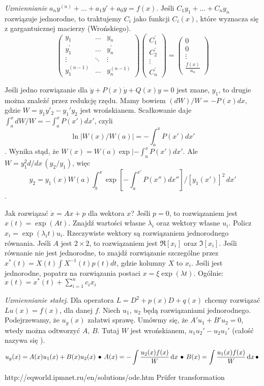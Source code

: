 \emph{Uzmiennianie}  $a_n y^{(n)} + \ldots + a_1 y' + a_0 y = f(x)$.
Jeśli $C_1 y_1 + \ldots + C_n y_n$ rozwiązuje jednorodne, to traktujemy $C_i$ jako funkcji $C_i(x)$, które wyznacza się z gargantuicznej macierzy (Wrońskiego).
\[
\begin{pmatrix} y_1 & \ldots & y_n \\ y_1^\prime & \ldots & y_n^\prime \\ \vdots & \ddots & \vdots \\ y_1^{(n-1)} & \ldots & y_n^{(n-1)} \end{pmatrix} \begin{pmatrix} C_1^\prime \\ C_2^\prime \\ \vdots \\ C_n^\prime \end{pmatrix} = \begin{pmatrix} 0 \\ 0 \\ \vdots \\ \frac{f(x)}{a_n} \end{pmatrix}
\]

Jeśli jedno rozwiązanie dla $\ddot y + P(x) \dot y + Q(x) y = 0$ jest znane, $y_1$, to drugie można znaleźć przez redukcję rzędu.
Mamy bowiem $(dW)/W = -P(x)dx$, gdzie $W = y_1y'_2 - y_1'y_2$ jest wrońskianem.
Scałkowanie daje $\int_a^x dW/W = -\int_a^x P(x') dx'$, czyli $$\ln |W(x) / W(a)| = - \int_a^x P(x') dx'$$.
Wynika stąd, że $W(x) = W(a) \exp |-\int_a^x P(x') dx'$.
Ale $W = y_1^2 d/dx \, (y_2 / y_1)$, więc $$y_2 = y_1(x) W(a) \int_b^x \exp[-\int_a^{x'} P(x'')dx''] / [y_1(x')]^2 \,dx'$$.

Jak rozwiązać $\dot x = Ax + p$ dla wektora $x$?
Jeśli $p=0$, to rozwiązaniem jest $x(t) = \exp(At)$.
Znajdź wartości własne $\lambda_i$ oraz wektory własne $u_i$.
Policz $x_i = \exp(\lambda_i t) u_i$.
Rzeczywiste wektory są rozwiązaniem jednorodnego równania.
Jeśli $A$ jest $2 \times 2$, to rozwiązaniem jest $\Re [x_i]$ oraz $\Im [x_i]$.
Jeśli równanie nie jest jednorodne, to znajdź rozwiązanie szczególne przez $x^*(t) = X(t) \int X^{-1}(t)p(t) dt$, gdzie kolumny $X$ to $x_i$.
Jeśli jest jednorodne, popatrz na rozwiązania postaci $x = \xi \exp(\lambda t)$.
Ogólnie: $x(t) =x^*(t) + \sum_{i=1}^n c_i x_i$

\emph{Uzmiennianie stałej}. 
Dla operatora $L = D^2 + p(x)D + q(x)$ chcemy rozwiązać $Lu(x) = f(x)$, dla danej $f$.
Niech $u_1$, $u_2$ będą rozwiązaniami jednorodnego.
Podejrzewamy, że $u_g(x)$ załatwi sprawę.
Umówmy się, że $A' u_1 + B' u_2 = 0$, wtedy można odtworzyć $A$, $B$.
Tutaj $W$ jest wrońskianem, $u_1u_2' - u_2u_1'$ (całość nazywa się ).
\[
	u_g(x)  = A(x) u_1(x) + B(x) u_2(x) \, \bullet \,
	A(x) = - \int \frac{u_2(x) f(x) }{W}\,\textrm{d}x \, \bullet \,
	B(x) = \int \frac{u_1(x) f(x) }{W}\,\textrm{d}x \, \bullet \,
\]


http://eqworld.ipmnet.ru/en/solutions/ode.htm
Prüfer transformation